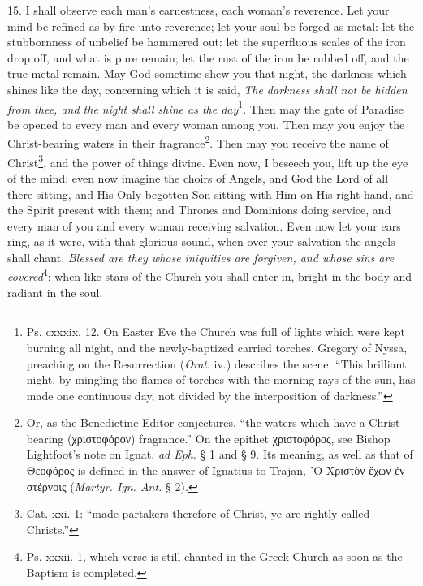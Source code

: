 15. I shall observe each man’s earnestness, each woman’s reverence. Let your mind be refined as by fire unto reverence; let your soul be forged as metal: let the stubbornness of unbelief be hammered out: let the superfluous scales of the iron drop off, and what is pure remain; let the rust of the iron be rubbed off, and the true metal remain. May God sometime shew you that night, the darkness which shines like the day, concerning which it is said, \emph{The darkness shall not be hidden from thee, and the night shall shine as the day}\footnote{Ps. cxxxix. 12. On Easter Eve the Church was full of lights which were kept burning all night, and the newly-baptized carried torches. Gregory of Nyssa, preaching on the Resurrection (\emph{Orat}. iv.) describes the scene: “This brilliant night, by mingling the flames of torches with the morning rays of the sun, has made one continuous day, not divided by the interposition of darkness.”}. Then may the gate of Paradise be opened to every man and every woman among you. Then may you enjoy the Christ-bearing waters in their fragrance\footnote{Or, as the Benedictine Editor conjectures, “the waters which have a Christ-bearing (\textgreek{χριστοφόρον}) fragrance.” On the epithet \textgreek{χριστοφόρος}, see Bishop Lightfoot’s note on Ignat. \emph{ad Eph}. § 1 and § 9. Its meaning, as well as that of \textgreek{Θεοφόρος} is defined in the answer of Ignatius to Trajan, \textgreek{῾Ο Χριστὸν ἔχων ἐν στέρνοις} (\emph{Martyr. Ign. Ant.} § 2).}. Then may you receive the name of Christ\footnote{Cat. xxi. 1: “made partakers therefore of Christ, ye are rightly called Christs.”}, and the power of things divine. Even now, I beseech you, lift up the eye of the mind: even now imagine the choirs of Angels, and God the Lord of all there sitting, and His Only-begotten Son sitting with Him on His right hand, and the Spirit present with them; and Thrones and Dominions doing service, and every man of you and every woman receiving salvation. Even now let your ears ring, as it were, with that glorious sound, when over your salvation the angels shall chant, \emph{Blessed are they whose iniquities are forgiven, and whose sins are covered}\footnote{Ps. xxxii. 1, which verse is still chanted in the Greek Church as soon as the Baptism is completed.}: when like stars of the Church you shall enter in, bright in the body and radiant in the soul.

